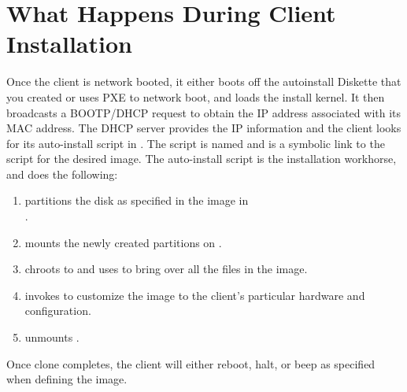 %
%
%

\section{What Happens During Client Installation}
\label{app:client-install}

Once the client is network booted, it either boots off the autoinstall
Diskette that you created or uses PXE to network boot, and loads the
install kernel.  It then broadcasts a BOOTP/DHCP request to obtain the
IP address associated with its MAC address. The DHCP server provides
the IP information and the client looks for its auto-install script in
. The script is named
 and is a symbolic link to the script for the
desired image.  The auto-install script is the installation workhorse,
and does the following:

\begin{enumerate}
\item partitions the disk as specified in the image in \\
  .
        
\item mounts the newly created partitions on .
  
\item chroots to  and uses  to bring over all the
  files in the image.
  
\item invokes  to customize the image to the
  client's particular hardware and configuration.

\item unmounts .
\end{enumerate}

Once clone completes, the client will either reboot, halt, or beep as
specified when defining the image.


